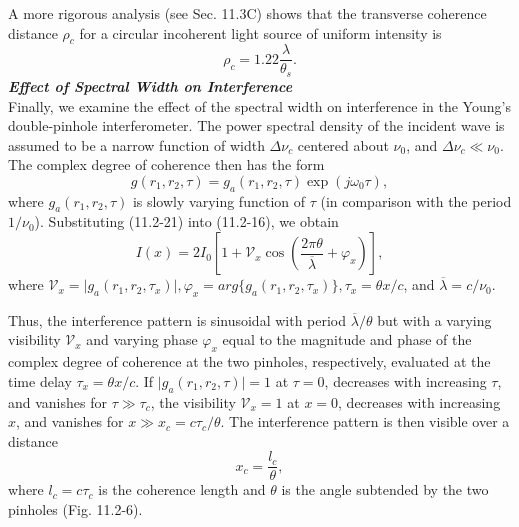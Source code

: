 \documentclass{article}
\numberwithin{figure}{subsection}
\numberwithin{table}{subsection}
\begin{document}
A more rigorous analysis (see Sec. 11.3C)  shows that the transverse coherence distance $\rho_c$ for a circular incoherent light source of uniform intensity is 
\begin{equation}
\rho_c = 1.22 \frac{\lambda}{\theta_s} .
\end{equation}
\bigbreak\noindent\textcolor{ksc}{\textbf{\textsl{Effect of Spectral Width on Interference}}}\\
Finally, we examine the effect of the spectral width on interference in the Young's double-pinhole interferometer. The power spectral density of the incident wave is assumed to be a narrow function of width $\Delta \nu_c$ centered about $\nu_0$, and $\Delta \nu_c \ll \nu_0$. The complex degree of coherence then has the form
\begin{equation}
g(r_1, r_2, \tau) = g_a (r_1, r_2, \tau) \exp (j\omega_0 \tau),
\end{equation}
where $g_a (r_1, r_2, \tau)$ is slowly varying function of $\tau$ (in comparison with the period $1 / \nu_0$). Substituting (11.2-21) into (11.2-16), we obtain
\begin{equation}
I(x) = 2I_0 [1 + \mathcal{V}_x \cos(\frac{2\pi \theta}{\overline{\lambda}} + \varphi_x)] ,
\end{equation}
where $\mathcal{V}_x = \lvert g_a (r_1, r_2, \tau_x) \rvert , \varphi_x = arg\{g_a (r_1, r_2, \tau_x)\} , \tau_x = \theta x / c$, and $\overline{\lambda} = c / \nu_0$.
\par Thus, the interference pattern is sinusoidal with period $\overline{\lambda} / \theta$ but with a varying visibility $\mathcal{V}_x$ and varying phase $\varphi_x$ equal to the magnitude and phase of the complex degree of coherence at the two pinholes, respectively, evaluated at the time delay $\tau_x = \theta x / c$. If $\lvert g_a(r_1, r_2, \tau) \rvert= 1$ at $\tau = 0$, decreases with increasing $\tau$, and vanishes for $\tau \gg \tau_c$, the visibility $\mathcal{V}_x = 1$ at $x =0$, decreases with increasing $x$, and vanishes for $x \gg x_c = c\tau_c / \theta$. The interference pattern is then visible over a distance
\begin{equation}
x_c = \frac{l_c}{\theta} , 
\end{equation}
where $l_c = c\tau_c$ is the coherence length and $\theta$ is the angle subtended by the two pinholes (Fig. 11.2-6).
\end{document}
